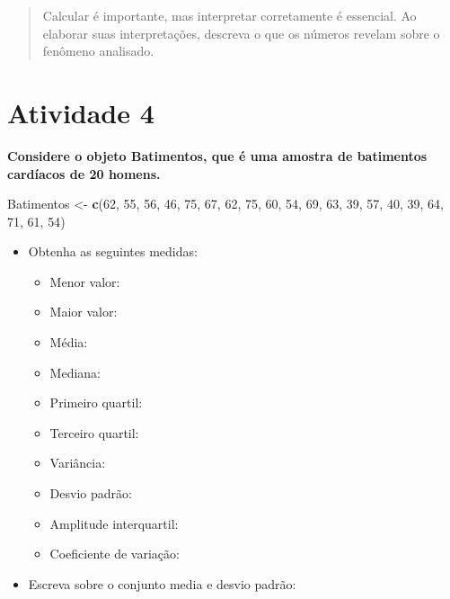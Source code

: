 \documentclass[
]{book}
\newenvironment{Shaded}{\begin{snugshade}}{\end{snugshade}}
\newcommand{\DecValTok}[1]{\textcolor[rgb]{0.00,0.00,0.81}{#1}}
\newcommand{\FunctionTok}[1]{\textcolor[rgb]{0.13,0.29,0.53}{\textbf{#1}}}
\newcommand{\NormalTok}[1]{#1}
\newcommand{\OtherTok}[1]{\textcolor[rgb]{0.56,0.35,0.01}{#1}}
\providecommand{\tightlist}{%
  \setlength{\itemsep}{0pt}\setlength{\parskip}{0pt}}
\begin{document}
\begin{quote}
Calcular é importante, mas interpretar corretamente é essencial. Ao elaborar suas interpretações, descreva o que os números revelam sobre o fenômeno analisado.
\end{quote}

\section{Atividade 4}\label{atividade-4}

\textbf{Considere o objeto Batimentos, que é uma amostra de batimentos cardíacos de 20 homens.}

\begin{Shaded}
\begin{Highlighting}[]
\NormalTok{Batimentos }\OtherTok{\textless{}{-}} \FunctionTok{c}\NormalTok{(}\DecValTok{62}\NormalTok{, }\DecValTok{55}\NormalTok{, }\DecValTok{56}\NormalTok{, }\DecValTok{46}\NormalTok{, }\DecValTok{75}\NormalTok{, }\DecValTok{67}\NormalTok{, }\DecValTok{62}\NormalTok{, }\DecValTok{75}\NormalTok{, }\DecValTok{60}\NormalTok{, }\DecValTok{54}\NormalTok{, }\DecValTok{69}\NormalTok{, }\DecValTok{63}\NormalTok{, }\DecValTok{39}\NormalTok{, }\DecValTok{57}\NormalTok{, }\DecValTok{40}\NormalTok{, }\DecValTok{39}\NormalTok{, }\DecValTok{64}\NormalTok{, }\DecValTok{71}\NormalTok{, }\DecValTok{61}\NormalTok{, }\DecValTok{54}\NormalTok{)}
\end{Highlighting}
\end{Shaded}

\begin{itemize}
\tightlist
\item
  Obtenha as seguintes medidas:

  \begin{itemize}
  \tightlist
  \item
    Menor valor:
  \item
    Maior valor:
  \item
    Média:
  \item
    Mediana:
  \item
    Primeiro quartil:
  \item
    Terceiro quartil:
  \item
    Variância:
  \item
    Desvio padrão:
  \item
    Amplitude interquartil:
  \item
    Coeficiente de variação:
  \end{itemize}
\item
  Escreva sobre o conjunto media e desvio padrão:
\end{itemize}
\end{document}
